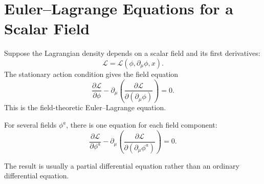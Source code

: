 \section{Euler--Lagrange Equations for a Scalar Field}

Suppose the Lagrangian density depends on a scalar field and its first
derivatives:
\[
    \mathcal{L}=\mathcal{L}(\phi,\partial_\mu\phi,x).
\]
The stationary action condition gives the field equation
\[
    \boxed{
    \frac{\partial \mathcal{L}}{\partial \phi}
    -
    \partial_\mu
    \left(
        \frac{\partial \mathcal{L}}
        {\partial(\partial_\mu\phi)}
    \right)
    =0.
    }
\]
This is the field-theoretic Euler--Lagrange equation.

For several fields \(\phi^a\), there is one equation for each field component:
\[
    \frac{\partial \mathcal{L}}{\partial \phi^a}
    -
    \partial_\mu
    \left(
        \frac{\partial \mathcal{L}}
        {\partial(\partial_\mu\phi^a)}
    \right)
    =0.
\]

The result is usually a partial differential equation rather than an ordinary
differential equation.
